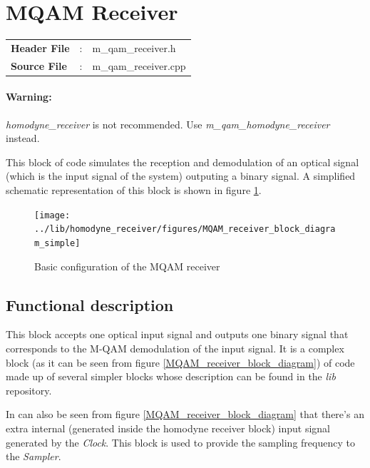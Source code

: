 \clearpage

\section{MQAM Receiver}

\begin{tcolorbox}	
	\begin{tabular}{p{2.75cm} p{0.2cm} p{10.5cm}} 	
		\textbf{Header File}   &:& m\_qam\_receiver.h \\
		\textbf{Source File}   &:& m\_qam\_receiver.cpp \\
	\end{tabular}
\end{tcolorbox}

\paragraph{Warning:}\textit{homodyne\_receiver} is not recommended. Use \textit{m\_qam\_homodyne\_receiver} instead.
\newline

This block of code simulates the reception and demodulation of an optical signal (which is the input signal of the system) outputing a binary signal. A simplified schematic representation of this block is shown in figure \ref{MQAM_receiver_block_diagram_simple}.

\begin{figure}[h]
	\centering
	\texttt{[image: ../lib/homodyne\_receiver/figures/MQAM\_receiver\_block\_diagram\_simple]}
	\caption{Basic configuration of the MQAM receiver}\label{MQAM_receiver_block_diagram_simple}
\end{figure}

\subsection*{Functional description}

This block accepts one optical input signal and outputs one binary signal that corresponds to the M-QAM demodulation of the input signal. It is a complex block (as it can be seen from figure \ref{MQAM_receiver_block_diagram}) of code made up of several simpler blocks whose description can be found in the \textit{lib} repository.

In can also be seen from figure \ref{MQAM_receiver_block_diagram} that there's an extra internal (generated inside the homodyne receiver block) input signal generated by the \textit{Clock}. This block is used to provide the sampling frequency to the \textit{Sampler}.


